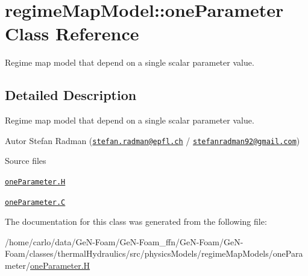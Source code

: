 \hypertarget{classFoam_1_1regimeMapModel_1_1oneParameter}{}\section{regime\+Map\+Model\+:\+:one\+Parameter Class Reference}
\label{classFoam_1_1regimeMapModel_1_1oneParameter}


Regime map model that depend on a single scalar parameter value.  




\subsection{Detailed Description}
Regime map model that depend on a single scalar parameter value. 

\label{_Description}%
 Autor Stefan Radman (\href{mailto:stefan.radman@epfl.ch}{\tt stefan.\+radman@epfl.\+ch} / \href{mailto:stefanradman92@gmail.com}{\tt stefanradman92@gmail.\+com})

\begin{DoxyParagraph}{Source files}

\begin{DoxyItemize}
\item \href{../../../home/carlo/data/GeN-Foam/GeN-Foam_ffn/GeN-Foam/GeN-Foam/classes/thermalHydraulics/src/physicsModels/regimeMapModels/oneParameter/oneParameter.H}{\tt one\+Parameter.\+H} 
\item \href{../../../home/carlo/data/GeN-Foam/GeN-Foam_ffn/GeN-Foam/GeN-Foam/classes/thermalHydraulics/src/physicsModels/regimeMapModels/oneParameter/oneParameter.C}{\tt one\+Parameter.\+C} 
\end{DoxyItemize}
\end{DoxyParagraph}


The documentation for this class was generated from the following file\+:\begin{DoxyCompactItemize}
\item 
/home/carlo/data/\+Ge\+N-\/\+Foam/\+Ge\+N-\/\+Foam\+\_\+ffn/\+Ge\+N-\/\+Foam/\+Ge\+N-\/\+Foam/classes/thermal\+Hydraulics/src/physics\+Models/regime\+Map\+Models/one\+Parameter/\hyperlink{oneParameter_8H}{one\+Parameter.\+H}\end{DoxyCompactItemize}
